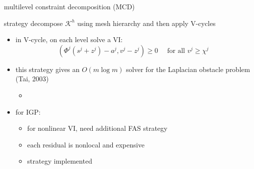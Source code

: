 \documentclass[usepdftitle=false,usenames,dvipsnames]{beamer}
\newcommand{\ip}[2]{\left(#1,#2\right)}
\begin{document}
\begin{frame}{multilevel constraint decomposition (MCD)}

\begin{block}{strategy}
decompose $\mathcal{K}^h$ using mesh hierarchy and then apply V-cycles
\end{block}

\begin{itemize}
\item in V-cycle, on each level solve a VI:
    $$\ip{\Phi^j(s^j + z^j) - a^j}{v^j - z^j} \ge 0 \quad \text{ for all $v^j \ge \chi^j$}$$

\item this strategy gives an $O(m\log m)$ solver for the Laplacian obstacle problem (Tai, 2003)
    \begin{itemize}
    \item {}
    \end{itemize}
\item for IGP:
    \begin{itemize}
    \item for nonlinear VI, need additional FAS strategy {\Large\strut} 
    \item each residual is nonlocal and expensive {\Large\strut} 
    \item<2> {\color{ForestGreen} strategy implemented}
    \end{itemize}
\end{itemize}
\end{frame}
\end{document}
